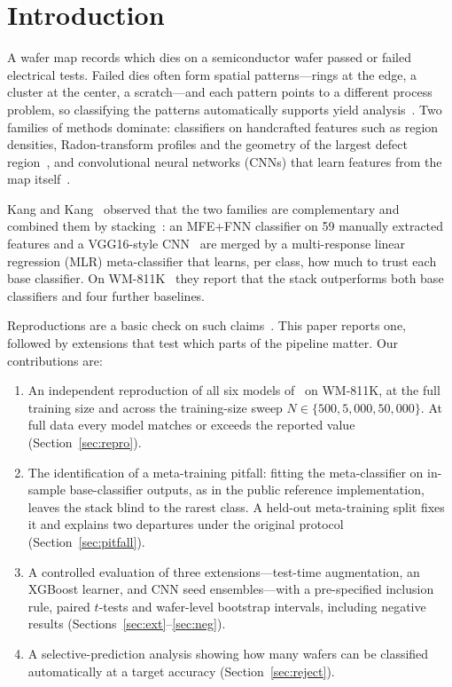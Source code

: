 \documentclass[conference]{IEEEtran}
\begin{document}
\section{Introduction}
A wafer map records which dies on a semiconductor wafer passed or failed electrical tests. Failed dies often form spatial
patterns---rings at the edge, a cluster at the center, a scratch---and each pattern points to a different process
problem, so classifying the patterns automatically supports yield analysis~\cite{wu2015wafer}. Two families of methods
dominate: classifiers on handcrafted features such as region densities, Radon-transform profiles and the geometry of the
largest defect region~\cite{wu2015wafer,piao2018radon,saqlain2019voting}, and convolutional neural networks (CNNs) that
learn features from the map itself~\cite{nakazawa2018wafer,kyeong2018mixed,yu2019cnn,saqlain2020cnn,kang2020rotation}.

Kang and Kang~\cite{kang2021stacking} observed that the two families are complementary and combined them by
stacking~\cite{wolpert1992stacked,ting1999issues}: an MFE+FNN classifier on 59 manually extracted features and a VGG16-style
CNN~\cite{simonyan2015vgg} are merged by a multi-response linear regression (MLR) meta-classifier that learns, per class,
how much to trust each base classifier. On WM-811K~\cite{wu2015wafer,mirlab} they report that the stack outperforms both
base classifiers and four further baselines.

Reproductions are a basic check on such claims~\cite{pineau2021reproducibility}. This paper reports one, followed by
extensions that test which parts of the pipeline matter. Our contributions are:
\begin{enumerate}
\item An independent reproduction of all six models of~\cite{kang2021stacking} on WM-811K, at the full training size and
across the training-size sweep $N\in\{500, 5{,}000, 50{,}000\}$. At full data every model matches or exceeds the
reported value (Section~\ref{sec:repro}).
\item The identification of a meta-training pitfall: fitting the meta-classifier on in-sample base-classifier outputs, as
in the public reference implementation, leaves the stack blind to the rarest class. A held-out meta-training split fixes
it and explains two departures under the original protocol (Section~\ref{sec:pitfall}).
\item A controlled evaluation of three extensions---test-time augmentation, an XGBoost learner, and CNN seed
ensembles---with a pre-specified inclusion rule, paired $t$-tests and wafer-level bootstrap intervals, including
negative results (Sections~\ref{sec:ext}--\ref{sec:neg}).
\item A selective-prediction analysis showing how many wafers can be classified automatically at a target accuracy
(Section~\ref{sec:reject}).
\end{enumerate}
\end{document}
